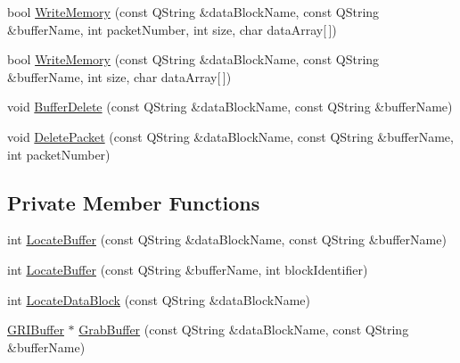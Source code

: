 \begin{DoxyCompactItemize}
\item 
bool \hyperlink{classGRIMemoryManager_ae4c6ca174caa41897316a9e681c2b76a}{\-Write\-Memory} (const \-Q\-String \&data\-Block\-Name, const \-Q\-String \&buffer\-Name, int packet\-Number, int size, char data\-Array\mbox{[}$\,$\mbox{]})
\item 
bool \hyperlink{classGRIMemoryManager_a76bbe9fc23773a8ec99d5d229dffe78c}{\-Write\-Memory} (const \-Q\-String \&data\-Block\-Name, const \-Q\-String \&buffer\-Name, int size, char data\-Array\mbox{[}$\,$\mbox{]})
\item 
void \hyperlink{classGRIMemoryManager_a70d455324b6f96504884752629d46324}{\-Buffer\-Delete} (const \-Q\-String \&data\-Block\-Name, const \-Q\-String \&buffer\-Name)
\item 
void \hyperlink{classGRIMemoryManager_a1bf8836f55fb2bed4b8fdca9ea7a692f}{\-Delete\-Packet} (const \-Q\-String \&data\-Block\-Name, const \-Q\-String \&buffer\-Name, int packet\-Number)
\end{DoxyCompactItemize}
\subsection*{\-Private \-Member \-Functions}
\begin{DoxyCompactItemize}
\item 
int \hyperlink{classGRIMemoryManager_a7ddf18c6143b5f0532027bf18e0ec75d}{\-Locate\-Buffer} (const \-Q\-String \&data\-Block\-Name, const \-Q\-String \&buffer\-Name)
\item 
int \hyperlink{classGRIMemoryManager_affdd57ed0aae56c854f3f81b1d5c333a}{\-Locate\-Buffer} (const \-Q\-String \&buffer\-Name, int block\-Identifier)
\item 
int \hyperlink{classGRIMemoryManager_a2e3e6ae5051a8dbdcf39ae53dda37f0b}{\-Locate\-Data\-Block} (const \-Q\-String \&data\-Block\-Name)
\item 
\hyperlink{classGRIBuffer}{\-G\-R\-I\-Buffer} $\ast$ \hyperlink{classGRIMemoryManager_a6cc53799aba9a36370131c14b3d42f1c}{\-Grab\-Buffer} (const \-Q\-String \&data\-Block\-Name, const \-Q\-String \&buffer\-Name)
\end{DoxyCompactItemize}
